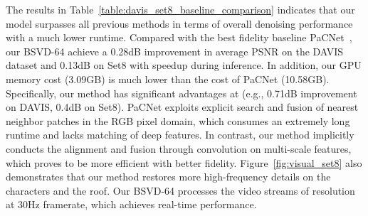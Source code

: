 \documentclass[sigconf]{acmart}
\begin{document}
The results in Table~\ref{table:davis_set8_baseline_comparison} indicates that our model surpasses all previous methods in terms of overall denoising performance with a much lower runtime. 
Compared with the best fidelity baseline PaCNet~\cite{Vaksman2021Patch}, our BSVD-64 achieve a 0.28dB improvement in average PSNR on the DAVIS dataset and 0.13dB on Set8 with  speedup during inference. 
In addition, our GPU memory cost (3.09GB) is much lower than the cost of PaCNet (10.58GB).
Specifically, our method has significant advantages at  (e.g., 0.71dB improvement on DAVIS, 0.4dB on Set8). PaCNet exploits explicit search and fusion of nearest neighbor patches in the RGB pixel domain, which consumes an extremely long runtime and lacks matching of deep features. In contrast, our method implicitly conducts the alignment and fusion through convolution on multi-scale features, which proves to be more efficient with better fidelity. Figure~\ref{fig:visual_set8} also demonstrates that our method restores more high-frequency details on the characters and the roof.
Our BSVD-64 processes the video streams of resolution  at 30Hz framerate, which achieves real-time performance.



\begin{table}[t]
\small
\centering
\renewcommand{\arraystretch}{1.0}
\caption{Quantitative comparisons of PSNR and SSIM on the CRVD test set. 
We test the averaged computation cost per frame on RGGB raw data with resolution .
}
\label{table:crvd_baseline_comparison}
\vspace{-10pt}
\end{table}
\end{document}
